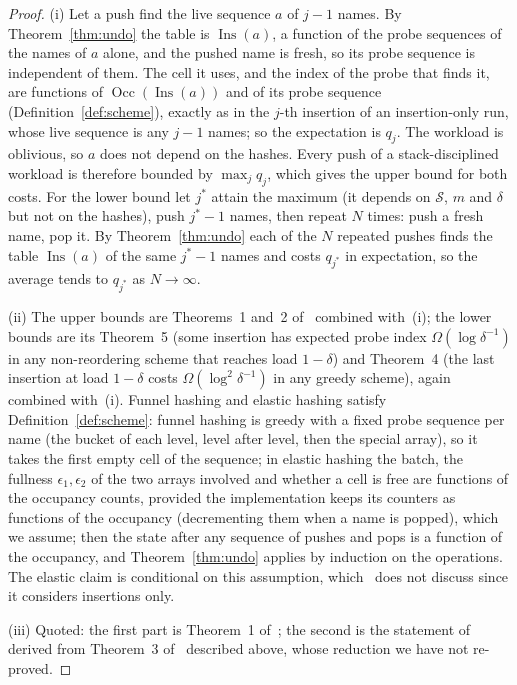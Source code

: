 \documentclass[11pt,a4paper]{article}
\theoremstyle{definition}
\theoremstyle{remark}
\DeclareMathOperator{\Ins}{Ins}
\DeclareMathOperator{\Occ}{Occ}
\begin{document}
\begin{proof}
(i) Let a push find the live sequence $a$ of $j-1$ names. By Theorem~\ref{thm:undo} the table is $\Ins(a)$, a function of the probe sequences of the names of $a$ alone, and the pushed name is fresh, so its probe sequence is independent of them. The cell it uses, and the index of the probe that finds it, are functions of $\Occ(\Ins(a))$ and of its probe sequence (Definition~\ref{def:scheme}), exactly as in the $j$-th insertion of an insertion-only run, whose live sequence is any $j-1$ names; so the expectation is $q_j$. The workload is oblivious, so $a$ does not depend on the hashes. Every push of a stack-disciplined workload is therefore bounded by $\max_jq_j$, which gives the upper bound for both costs. For the lower bound let $j^*$ attain the maximum (it depends on $\mathcal S$, $m$ and $\delta$ but not on the hashes), push $j^*-1$ names, then repeat $N$ times: push a fresh name, pop it. By Theorem~\ref{thm:undo} each of the $N$ repeated pushes finds the table $\Ins(a)$ of the same $j^*-1$ names and costs $q_{j^*}$ in expectation, so the average tends to $q_{j^*}$ as $N\to\infty$.

(ii) The upper bounds are Theorems~1 and~2 of~\cite{fkk2024} combined with~(i); the lower bounds are its Theorem~5 (some insertion has expected probe index $\Omega(\log\delta^{-1})$ in any non-reordering scheme that reaches load $1-\delta$) and Theorem~4 (the last insertion at load $1-\delta$ costs $\Omega(\log^2\delta^{-1})$ in any greedy scheme), again combined with~(i). Funnel hashing and elastic hashing satisfy Definition~\ref{def:scheme}: funnel hashing is greedy with a fixed probe sequence per name (the bucket of each level, level after level, then the special array), so it takes the first empty cell of the sequence; in elastic hashing the batch, the fullness $\epsilon_1,\epsilon_2$ of the two arrays involved and whether a cell is free are functions of the occupancy counts, provided the implementation keeps its counters as functions of the occupancy (decrementing them when a name is popped), which we assume; then the state after any sequence of pushes and pops is a function of the occupancy, and Theorem~\ref{thm:undo} applies by induction on the operations. The elastic claim is conditional on this assumption, which~\cite{fkk2024} does not discuss since it considers insertions only.

(iii) Quoted: the first part is Theorem~1 of~\cite{fkk2024}; the second is the statement of~\cite{fkk2024} derived from Theorem~3 of~\cite{tinypointers2025} described above, whose reduction we have not re-proved.
\end{proof}
\end{document}
